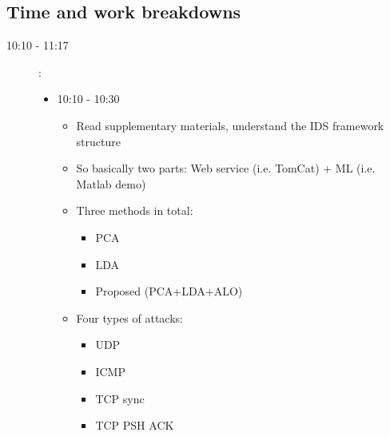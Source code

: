 \documentclass[a4paper]{article}
\begin{document}
\subsection{Time and work breakdowns}
\begin{description}
	\item [10:10 - 11:17]:
	\begin{itemize}
		\item 10:10 - 10:30 
			\begin{itemize}
				\item Read supplementary materials, understand the IDS framework structure
				\item So basically two parts: Web service (i.e. TomCat) + ML (i.e. Matlab demo)
				\item Three methods in total:
					\begin{itemize}
						\item PCA
						\item LDA
						\item Proposed (PCA+LDA+ALO)
					\end{itemize}

				\item Four types of attacks:
					\begin{itemize}
						\item UDP
						\item ICMP
						\item TCP sync
						\item TCP PSH ACK
					\end{itemize}
			\end{itemize}
			

\end{itemize}
\end{description}
\end{document}

